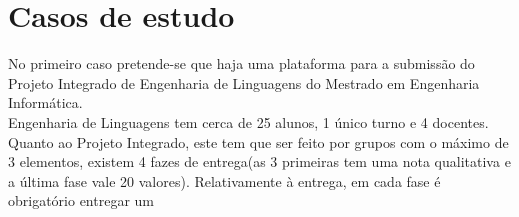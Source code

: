 \section{Casos de estudo}


No primeiro caso pretende-se que haja uma plataforma para a submissão do Projeto Integrado de Engenharia de Linguagens do Mestrado em Engenharia Informática.\\
Engenharia de Linguagens tem cerca de 25 alunos, 1 único turno e 4 docentes.
Quanto ao Projeto Integrado, este tem que ser feito por grupos com o máximo de 3 elementos, existem 4 fazes de entrega(as 3 primeiras tem uma nota qualitativa e a última fase vale 20 valores). Relativamente à entrega, em cada fase é obrigatório entregar um
